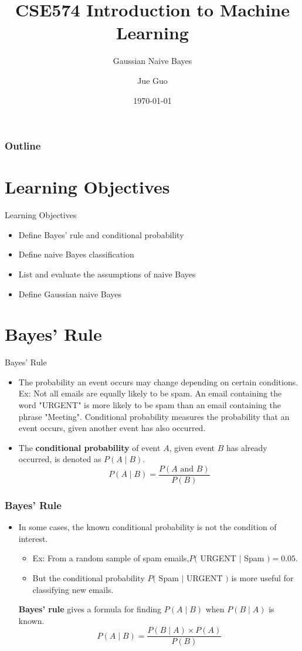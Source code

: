 \documentclass[10pt,dvipsnames]{beamer}
\title{CSE574 Introduction to Machine Learning}
\subtitle{Gaussian Naive Bayes}
\author{Jue Guo}
\institute{University at Buffalo}
\date{\today}
\begin{document}
\begin{frame}
    \titlepage
\end{frame}
\begin{frame}
    \frametitle{Outline}
    \tableofcontents
\end{frame}
\section{Learning Objectives}
\begin{frame}{Learning Objectives}
    \begin{itemize}
        \item Define Bayes' rule and conditional probability
        \item Define naive Bayes classification
        \item List and evaluate the assumptions of naive Bayes
        \item Define Gaussian naive Bayes
    \end{itemize}
\end{frame}

\section{Bayes' Rule}
\begin{frame}{Bayes' Rule}
    \begin{itemize}
        \item  The probability an event occurs may change depending on certain conditions. Ex: Not all emails are equally likely to be spam. An email containing the word "URGENT" is more likely to be spam than an email containing the phrase "Meeting". Conditional probability measures the probability that an event occurs, given another event has also occurred.
        \item  The \textbf{conditional probability} of event \(A\), given event \(B\) has already occurred, is denoted as \(P(A \mid B)\).
              $$
                  P(A \mid B)=\frac{P(A \text { and } B)}{P(B)}
              $$
    \end{itemize}
\end{frame}

\begin{frame}
    \frametitle{Bayes' Rule}
    \begin{itemize}
        \item In some cases, the known conditional probability is not the condition of interest.
              \begin{itemize}
                  \item Ex: From a random sample of spam emails,\(P(\) URGENT \(\mid\) Spam \()=0.05\).
                  \item But the conditional probability \(P(\) Spam \(\mid\) URGENT \()\) is more useful for classifying new emails.
              \end{itemize}
              \textbf{Bayes' rule} gives a formula for finding \(P(A \mid B)\) when \(P(B \mid A)\) is known.
              $$
                  P(A \mid B)=\frac{P(B \mid A) \times P(A)}{P(B)}
              $$
    \end{itemize}
\end{frame}
\end{document}
